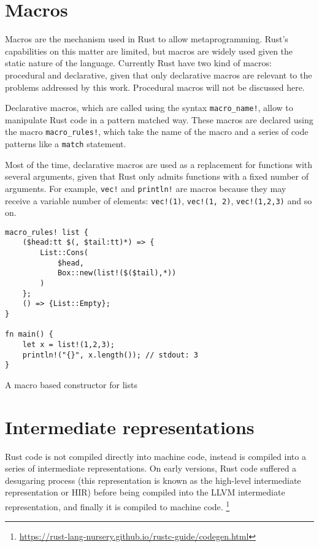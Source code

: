 \section{Macros}

Macros are the mechanism used in Rust to allow metaprogramming. Rust's
capabilities on this matter are limited, but macros are widely used given the
static nature of the language. Currently Rust have two kind of macros:
procedural and declarative, given that only declarative macros are relevant to
the problems addressed by this work. Procedural macros will not be discussed
here.

Declarative macros, which are called using the syntax \texttt{macro\_name!},
allow to manipulate Rust code in a pattern matched way. These macros are
declared using the macro \texttt{macro\_rules!}, which take the name of the
macro and a series of code patterns like a \texttt{match} statement. 

Most of the time, declarative macros are used as a replacement for functions
with several arguments, given that Rust only admits functions with a fixed
number of arguments. For example, \texttt{vec!} and \texttt{println!} are macros
because they may receive a variable number of elements: \texttt{vec!(1)},
\texttt{vec!(1, 2)},  \texttt{vec!(1,2,3)} and so on.


\begin{listing}[ht]
	\begin{verbatim}
macro_rules! list {
    ($head:tt $(, $tail:tt)*) => {
        List::Cons(
            $head, 
            Box::new(list!($($tail),*))
        )
    };
    () => {List::Empty};
}

fn main() {
    let x = list!(1,2,3);
    println!("{}", x.length()); // stdout: 3
}
    \end{verbatim}
  \caption{A macro based constructor for lists}
  \label{lst:declarative_macro}
\end{listing}

\section{Intermediate representations}

Rust code is not compiled directly into machine code, instead is compiled into a
series of intermediate representations. On early versions, Rust code suffered a
desugaring process (this representation is known as the high-level intermediate
representation or HIR) before being compiled into the LLVM intermediate
representation, and finally it is compiled to machine code.
\footnote{\url{https://rust-lang-nursery.github.io/rustc-guide/codegen.html}}

